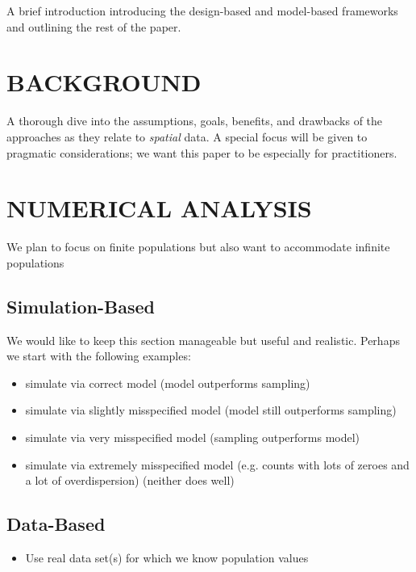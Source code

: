 A brief introduction introducing the design-based and model-based frameworks and outlining the rest of the paper. 

\section{\centering BACKGROUND}\label{sec:background}

A thorough dive into the assumptions, goals, benefits, and drawbacks of the approaches as they relate to \emph{spatial} data. A special focus will be given to pragmatic considerations; we want this paper to be especially for practitioners.

\section{\centering NUMERICAL ANALYSIS}\label{sec:numerical}

We plan to focus on finite populations but also want to accommodate infinite populations

\subsection{Simulation-Based}

We would like to keep this section manageable but useful and realistic. Perhaps we start with the following examples: 
\begin{itemize}
  \item simulate via correct model (model outperforms sampling)
  \item simulate via slightly misspecified model (model still outperforms sampling)
  \item simulate via very misspecified model (sampling outperforms model)
  \item simulate via extremely misspecified model (e.g. counts with lots of zeroes and a lot of overdispersion) (neither does well)
\end{itemize}

\subsection{Data-Based}

\begin{itemize}
  \item Use real data set(s) for which we know population values 
\end{itemize}


